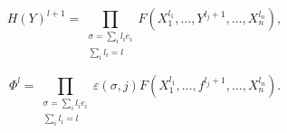 \begin{equation}
  H(Y)^{l+1}=
  \prod_{\substack{\sigma=\sum_i l_i e_i\\ \sum_i l_i=l}}
  F(X_1^{l_1},\ldots,Y^{l_j+1},\ldots,X_n^{l_n}),
  \tag{3.4.3.3}
\end{equation}

\[
  \Phi^l=
  \prod_{\substack{\sigma=\sum_i l_i e_i\\ \sum_i l_i=l}}
  \varepsilon(\sigma,j)
  F(X_1^{l_1},\ldots,f^{l_j+1},\ldots,X_n^{l_n}).
\]
\endgroup
